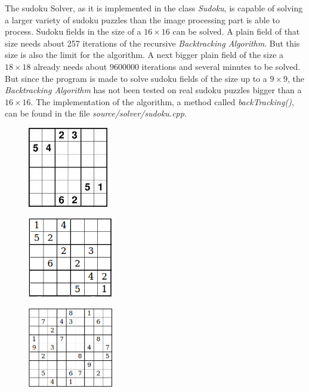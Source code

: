 \documentclass[
a4paper,     %
12pt         %
]{scrartcl}  %
\begin{document}
The sudoku Solver, as it is implemented in the class \emph{Sudoku}, is capable of solving a larger variety of 
sudoku puzzles than the image processing part is able to process. Sudoku fields in the size of a $16 \times 16$ can be solved.
A plain field of that size needs about 257 iterations of the recursive \emph{Backtracking Algorithm}. But this size is also the limit 
for the algorithm. A next bigger plain field of the size a $18 \times 18$ already needs about $9600000$ iterations and several 
minutes to be solved. But since the program is made to solve sudoku fields of the size up to a $9 \times 9$, the 
\emph{Backtracking Algorithm} has not been tested on real sudoku puzzles bigger than a $16 \times 16$. The implementation of the algorithm, 
a method called \emph{backTracking()}, can be found in the file \emph{source/solver/sudoku.cpp}.
\begin{figure}[!bhp]
   \begin{center}
     \begin{minipage}[h]{3.8cm}
       \includegraphics[height=3.5cm]{imgs/6x6up.png}
       \label{fig:6x6up}
       \subcaption{}
     \end{minipage}
     \begin{minipage}[h]{3.8cm}
       \includegraphics[height=3.5cm]{imgs/solver_6x6.png}
       \label{fig:6x6}
       \subcaption{}
     \end{minipage}
     \begin{minipage}[h]{3.8cm}
       \includegraphics[height=3.5cm]{imgs/solver_9x9.png}

\end{minipage}
\end{center}
\end{figure}
\end{document}

